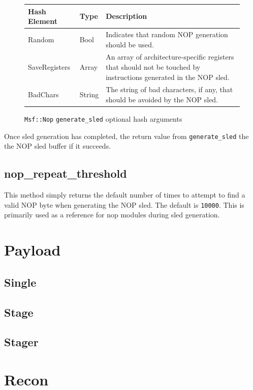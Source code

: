 \documentclass{report}
\begin{document}
\begin{figure}[h]
\begin{center}
\begin{tabular}{|l|l|p{3.0in}|}
\hline
\textbf{Hash Element} & \textbf{Type} & \textbf{Description} \\
\hline
Random & Bool & Indicates that random NOP generation should be used. \\
\hline
SaveRegisters & Array & An array of architecture-specific registers that should not be touched by instructions generated in the NOP sled. \\
\hline
BadChars & String & The string of bad characters, if any, that should be avoided by the NOP sled. \\
\hline
\end{tabular}
\caption{\texttt{Msf::Nop} \texttt{generate\_sled} optional hash
arguments} \label{fig-table-nop-genhash}
\end{center}
\end{figure}

\par
Once sled generation has completed, the return value from
\texttt{generate\_sled} the the NOP sled buffer if it succeeds.

        \subsection{nop\_repeat\_threshold}

\par
This method simply returns the default number of times to attempt to
find a valid NOP byte when generating the NOP sled.  The default is
\texttt{10000}.  This is primarily used as a reference for nop
modules during sled generation.

    \section{Payload}
        \subsection{Single}
        \subsection{Stage}
        \subsection{Stager}
    \section{Recon}
\end{document}
